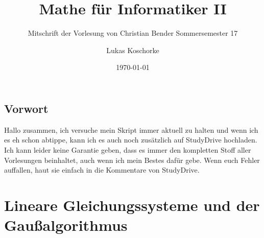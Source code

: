 \documentclass{scrbook}
\begin{document}
\frontmatter
\begin{titlepage}
\title{Mathe für Informatiker II}
\subtitle{Mitschrift der Vorlesung von Christian Bender Sommersemester 17}
\author{Lukas Koschorke}
\date{\today}
\maketitle
\end{titlepage}
\section*{Vorwort}
Hallo zusammen, ich versuche mein Skript immer aktuell zu halten und wenn ich es eh schon abtippe, kann ich es auch noch zusätzlich auf StudyDrive hochladen. Ich kann leider keine Garantie geben, dass es immer den kompletten Stoff aller Vorlesungen beinhaltet, auch wenn ich mein Bestes dafür gebe. Wenn euch Fehler auffallen, haut sie einfach in die Kommentare von StudyDrive.
\tableofcontents
\mainmatter
\chapter{Lineare Gleichungssysteme und der Gaußalgorithmus}
\end{document}
